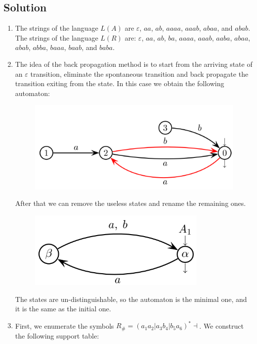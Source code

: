 \documentclass[12pt, a4paper]{report}
\newtheorem[style=M,bodystyle=\normalfont]{theorem}{Theorem}
\newtheorem[style=M,bodystyle=\normalfont]{corollary}{Corollary}
\newtheorem[style=M,bodystyle=\normalfont]{lemma}{Lemma}
\newtheorem[style=M,bodystyle=\normalfont]{definition}{Definition}
\begin{document}
    \subsection*{Solution}
        \begin{enumerate}
            \item The strings of the language $L(A)$ are $\varepsilon$, $aa$, $ab$, $aaaa$, $aaab$, $abaa$, and $abab$. 
                The strings of the language $L(R)$ are: $\varepsilon$, $aa$, $ab$, $ba$, $aaaa$, $aaab$, $aaba$, $abaa$, $abab$, $abba$, $baaa$, $baab$, and $baba$. 
            \item The idea of the back propagation method is to start from the arriving state of an $\varepsilon$ transition, eliminate the spontaneous transition and back propagate the transition exiting from the state.
                In this case we obtain the following automaton: 
                \begin{figure}[H]
                    \centering
                    \includegraphics[width=0.5\linewidth]{images/FSA2a.png}
                \end{figure}
                After that we can remove the useless states and rename the remaining ones. 
                \begin{figure}[H]
                    \centering
                    \includegraphics[width=0.5\linewidth]{images/FSA3a.png}
                \end{figure}
                The states are un-distinguishable, so the automaton is the minimal one, and it is the same as the initial one. 
            \item First, we enumerate the symbols $R_{\#}=\left( a_1a_2|a_3b_4|b_5a_6 \right)^{*}\dashv$. We construct the following support table: 
                \begin{table}[H]
                    \centering
                    \begin{tabular}{cc}

\end{tabular}
\end{table}
\end{enumerate}
\end{document}
